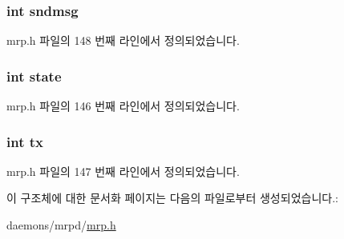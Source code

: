 \subsubsection[{\texorpdfstring{sndmsg}{sndmsg}}]{\setlength{\rightskip}{0pt plus 5cm}int sndmsg}\hypertarget{structmrp__timer_ab5da457547f90222856e97e186840f16}{}\label{structmrp__timer_ab5da457547f90222856e97e186840f16}


mrp.\+h 파일의 148 번째 라인에서 정의되었습니다.

\subsubsection[{\texorpdfstring{state}{state}}]{\setlength{\rightskip}{0pt plus 5cm}int state}\hypertarget{structmrp__timer_a89f234133d3efe315836311cbf21c64b}{}\label{structmrp__timer_a89f234133d3efe315836311cbf21c64b}


mrp.\+h 파일의 146 번째 라인에서 정의되었습니다.

\subsubsection[{\texorpdfstring{tx}{tx}}]{\setlength{\rightskip}{0pt plus 5cm}int tx}\hypertarget{structmrp__timer_a40590f55f82df430f8035df8dd4f03c2}{}\label{structmrp__timer_a40590f55f82df430f8035df8dd4f03c2}


mrp.\+h 파일의 147 번째 라인에서 정의되었습니다.



이 구조체에 대한 문서화 페이지는 다음의 파일로부터 생성되었습니다.\+:\begin{DoxyCompactItemize}
\item 
daemons/mrpd/\hyperlink{mrp_8h}{mrp.\+h}\end{DoxyCompactItemize}

